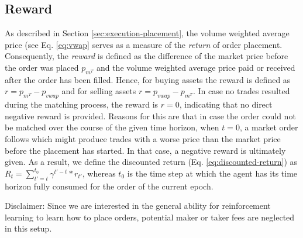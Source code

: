 \subsection{Reward}
\label{setup:reward}
As described in Section \ref{sec:execution-placement}, the volume weighted average price (see Eq. \ref{eq:vwap} serves as a measure of the \textit{return} of order placement.
Consequently, the \textit{reward} is defined as the difference of the market price before the order was placed $p_{m^T}$ and the volume weighted average price paid or received after the order has been filled. 
Hence, for buying assets the reward is defined as $r=p_{m^T}-p_{vwap}$ and for selling assets $r=p_{vwap}-p_{m^T}$.
In case no trades resulted during the matching process, the reward is $r=0$, indicating that no direct negative reward is provided.
Reasons for this are that in case the order could not be matched over the course of the given time horizon, when $t=0$, a market order follows which might produce trades with a worse price than the market price before the placement has started.
In that case, a negative reward is ultimately given.
As a result, we define the discounted return (Eq. \ref{eq:discounted-return}) as $R_t=\sum_{t'=t}^{t_0}{\gamma^{t'-t}*r_{t'}}$, whereas $t_0$ is the time step at which the agent has its time horizon fully consumed for the order of the current epoch.

Disclaimer: Since we are interested in the general ability for reinforcement learning to learn how to place orders, potential maker or taker fees are neglected in this setup.

